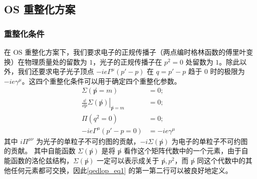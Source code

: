\subsection{OS 重整化方案}
\subsubsection{重整化条件}
在 OS 重整化方案下，我们要求电子的正规传播子（两点编时格林函数的傅里叶变换）在物理质量处的留数为 $1$，光子的正规传播子在 $p^2=0$ 处留数为 $1$。除此以外，我们还要求电子光子顶点 $-ie\Gamma^\mu(p'-p)$ 在 $q=p'-p$ 趋于 $0$ 时的极限为 $-ie\gamma^\mu$。这四个重整化条件可以用于确定四个重整化参数。
\begin{equation}\label{qedlop_eq1}
\begin{aligned}
\Sigma(\not p=m) &= 0;\\
\left.\frac{\dd }{\dd p}\Sigma(\not p)\right|_{\not p=m}&=0;\\
\Pi(q^2=0)&=0;\\
-ie\Gamma^\mu(p'-p=0)&=-ie\gamma^\mu
\end{aligned}
\end{equation}
其中 $i\Pi^{\mu\nu}$ 为光子的单粒子不可约图的贡献，$-i\Sigma(\not p)$ 为电子的单粒子不可约图的贡献。
其中自能函数 $\Sigma(\not p)$ 是将 $\not p$ 看作这个矩阵代数中的一个元素，由于自能函数的洛伦兹结构，$\Sigma(\not p)$ 一定可以表示成关于 $\not p, p^2$，而 $\not p$ 同这个代数中的其他任何元素都可交换，因此\autoref{qedlop_eq1} 的第一第二行可以被良好地定义。
